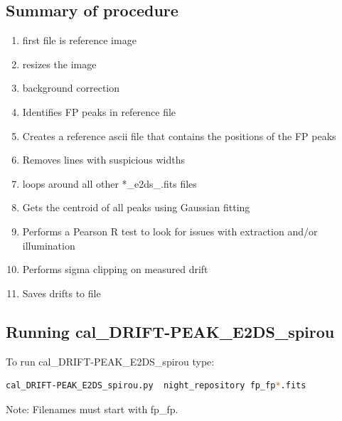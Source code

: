 \subsection{Summary of procedure}
\begin{enumerate}
	\item first file is reference image
	\item resizes the image
	\item background correction
	\item Identifies FP peaks in reference file
	\item Creates a reference ascii file that contains the positions of the FP peaks
	\item Removes lines with suspicious widths
	\item loops around all other *\_e2ds\_.fits files
	\item Gets the centroid of all peaks using Gaussian fitting
	\item Performs a Pearson R test to look for issues with extraction and/or illumination
	\item Performs sigma clipping on measured drift
	\item Saves drifts to file
\end{enumerate}

\subsection{Running cal\_DRIFT-PEAK\_E2DS\_spirou}

To run cal\_DRIFT-PEAK\_E2DS\_spirou type:
\begin{lstlisting}[language=bash, style=bashstyle]
cal_DRIFT-PEAK_E2DS_spirou.py  night_repository fp_fp*.fits
\end{lstlisting}

\noindent Note: Filenames must start with fp\_fp.





